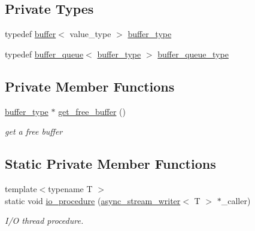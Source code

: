 \subsection*{Private Types}
\begin{DoxyCompactItemize}
\item 
typedef \hyperlink{structbuffer}{buffer}$<$ value\+\_\+type $>$ \hyperlink{classasync__stream__writer_a7e813664993581eab8d5fc6bcff2ce19}{buffer\+\_\+type}
\item 
typedef \hyperlink{structbuffer__queue}{buffer\+\_\+queue}$<$ \hyperlink{classasync__stream__writer_a7e813664993581eab8d5fc6bcff2ce19}{buffer\+\_\+type} $>$ \hyperlink{classasync__stream__writer_a44dba276c5208314653dd887010e7161}{buffer\+\_\+queue\+\_\+type}
\end{DoxyCompactItemize}
\subsection*{Private Member Functions}
\begin{DoxyCompactItemize}
\item 
\hyperlink{classasync__stream__writer_a7e813664993581eab8d5fc6bcff2ce19}{buffer\+\_\+type} $\ast$ \hyperlink{classasync__stream__writer_ad73941af15cf207e12376db3e2ffbfcd}{get\+\_\+free\+\_\+buffer} ()
\begin{DoxyCompactList}\small\item\em get a free buffer \end{DoxyCompactList}\end{DoxyCompactItemize}
\subsection*{Static Private Member Functions}
\begin{DoxyCompactItemize}
\item 
{\footnotesize template$<$typename T $>$ }\\static void \hyperlink{classasync__stream__writer_a5fcc9c840654d18ba14668e43a3a0f31}{io\+\_\+procedure} (\hyperlink{classasync__stream__writer}{async\+\_\+stream\+\_\+writer}$<$ T $>$ $\ast$\+\_\+caller)
\begin{DoxyCompactList}\small\item\em I/O thread procedure. \end{DoxyCompactList}\end{DoxyCompactItemize}
